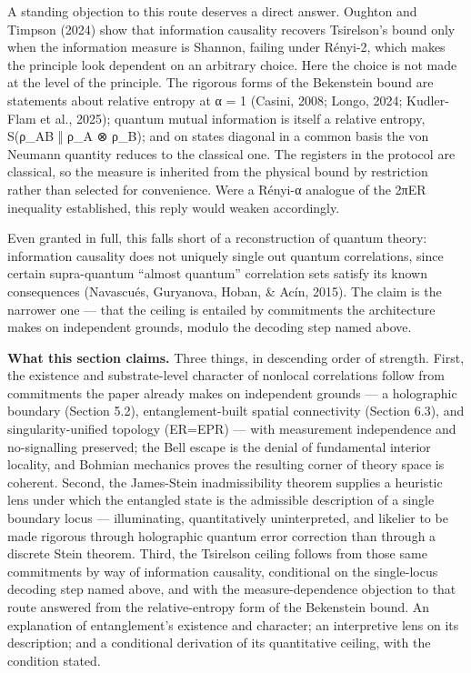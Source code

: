 \documentclass[
]{article}
\begin{document}
A standing objection to this route deserves a direct answer. Oughton and
Timpson (2024) show that information causality recovers Tsirelson's
bound only when the information measure is Shannon, failing under
Rényi-2, which makes the principle look dependent on an arbitrary
choice. Here the choice is not made at the level of the principle. The
rigorous forms of the Bekenstein bound are statements about relative
entropy at α = 1 (Casini, 2008; Longo, 2024; Kudler-Flam et al., 2025);
quantum mutual information is itself a relative entropy, S(ρ\_AB ‖ ρ\_A
⊗ ρ\_B); and on states diagonal in a common basis the von Neumann
quantity reduces to the classical one. The registers in the protocol are
classical, so the measure is inherited from the physical bound by
restriction rather than selected for convenience. Were a Rényi-α
analogue of the 2πER inequality established, this reply would weaken
accordingly.

Even granted in full, this falls short of a reconstruction of quantum
theory: information causality does not uniquely single out quantum
correlations, since certain supra-quantum ``almost quantum'' correlation
sets satisfy its known consequences (Navascués, Guryanova, Hoban, \&
Acín, 2015). The claim is the narrower one --- that the ceiling is
entailed by commitments the architecture makes on independent grounds,
modulo the decoding step named above.

\textbf{What this section claims.} Three things, in descending order of
strength. First, the existence and substrate-level character of nonlocal
correlations follow from commitments the paper already makes on
independent grounds --- a holographic boundary (Section 5.2),
entanglement-built spatial connectivity (Section 6.3), and
singularity-unified topology (ER=EPR) --- with measurement independence
and no-signalling preserved; the Bell escape is the denial of
fundamental interior locality, and Bohmian mechanics proves the
resulting corner of theory space is coherent. Second, the James-Stein
inadmissibility theorem supplies a heuristic lens under which the
entangled state is the admissible description of a single boundary locus
--- illuminating, quantitatively uninterpreted, and likelier to be made
rigorous through holographic quantum error correction than through a
discrete Stein theorem. Third, the Tsirelson ceiling follows from those
same commitments by way of information causality, conditional on the
single-locus decoding step named above, and with the measure-dependence
objection to that route answered from the relative-entropy form of the
Bekenstein bound. An explanation of entanglement's existence and
character; an interpretive lens on its description; and a conditional
derivation of its quantitative ceiling, with the condition stated.
\end{document}
